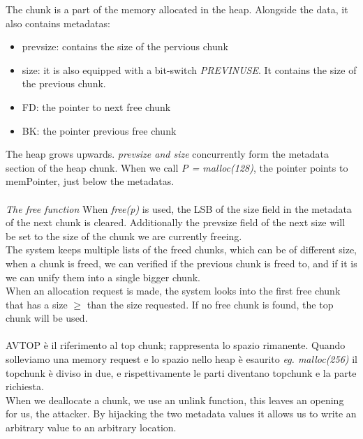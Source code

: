 \documentclass[11pt, oneside]{article}   	%
\begin{document}
The chunk is a part of the memory allocated in the heap. Alongside the data, it also contains metadatas:
\begin{itemize}
\item prev\textunderscore size: contains the size of the pervious chunk 
\item size: it is also equipped with a bit-switch \emph{PREV\textunderscore INUSE}.
It contains the size of the previous chunk.
\item FD: the pointer to next free chunk
\item BK: the pointer previous free chunk
\end{itemize}

The heap grows upwards.
\emph{prev\textunderscore size and size} concurrently form the metadata section of the heap chunk.
When we call \emph{P = malloc(128)}, the pointer points to memPointer, just below the metadatas.\\\\
\emph{The free function}
When \emph{free(p)} is used, the LSB of the size field in the metadata of the next chunk is cleared. Additionally the prev\textunderscore size field of the next size will be set to the size of the chunk we are currently freeing. \\
The system keeps multiple lists of the freed chunks, which can be of different size, when a chunk is freed, we can verified if the previous chunk is freed to, and if it is we can unify them into a single bigger chunk.\\
When an allocation request is made, the system looks into the first free chunk that has a size \(\geq\) than the size requested. If no free chunk is found, the top chunk will be used.\\\\
AV\textunderscore TOP è il riferimento al top chunk; rappresenta lo spazio rimanente. Quando solleviamo una memory request e lo spazio nello heap è esaurito \emph{eg. malloc(256)} il topchunk è diviso in due, e rispettivamente le parti diventano topchunk e la parte richiesta.\\
When we deallocate a chunk, we use an unlink function, this leaves an opening for us, the attacker. By hijacking the two metadata values it allows us to write an arbitrary value to an arbitrary location.
\end{document}
